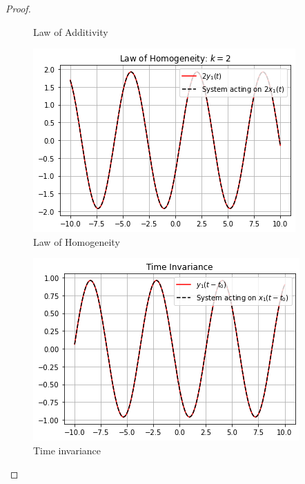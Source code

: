 \documentclass[journal,12pt,twocolumn]{IEEEtran}
\begin{document}
\begin{proof}
\begin{figure}[!ht]
 \caption{Law of Additivity}
 \end{figure}
 \begin{figure}[!ht]
\centering
 \includegraphics[width=\columnwidth]{graphs/law_of_homogeneity.png}

 \caption{Law of Homogeneity}
 \end{figure}
  \begin{figure}[!ht]
\centering
 \includegraphics[width=\columnwidth]{graphs/time_invariance.png}
 \caption{Time invariance}
 \end{figure}
\end{proof}
\end{document}
